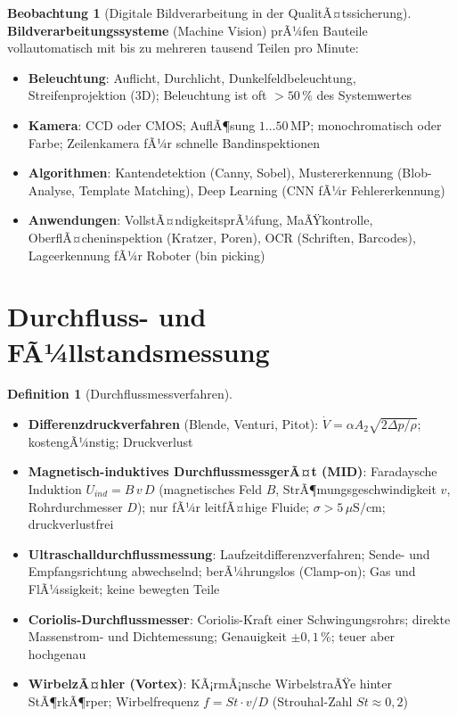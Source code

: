 ﻿\documentclass[a4paper,12pt]{report}
\theoremstyle{definition}
\newtheorem{definition}{Definition}
\newtheorem{beobachtung}{Beobachtung}
\begin{document}
\begin{beobachtung}[Digitale Bildverarbeitung in der QualitÃ¤tssicherung]
\textbf{Bildverarbeitungssysteme} (Machine Vision) prÃ¼fen Bauteile
vollautomatisch mit bis zu mehreren tausend Teilen pro Minute:
\begin{itemize}
    \item[-] \textbf{Beleuchtung}: Auflicht, Durchlicht, Dunkelfeldbeleuchtung,
          Streifenprojektion (3D); Beleuchtung ist oft $> 50\,\%$ des Systemwertes
    \item[-] \textbf{Kamera}: CCD oder CMOS; AuflÃ¶sung $1\ldots50\,\mathrm{MP}$;
          monochromatisch oder Farbe; Zeilenkamera fÃ¼r schnelle Bandinspektionen
    \item[-] \textbf{Algorithmen}: Kantendetektion (Canny, Sobel),
          Mustererkennung (Blob-Analyse, Template Matching),
          Deep Learning (CNN fÃ¼r Fehlererkennung)
    \item[-] \textbf{Anwendungen}: VollstÃ¤ndigkeitsprÃ¼fung, MaÃŸkontrolle,
          OberflÃ¤cheninspektion (Kratzer, Poren), OCR (Schriften, Barcodes),
          Lageerkennung fÃ¼r Roboter (bin picking)
\end{itemize}
\end{beobachtung}

\section{Durchfluss- und FÃ¼llstandsmessung}

\begin{definition}[Durchflussmessverfahren]
\begin{itemize}
    \item[-] \textbf{Differenzdruckverfahren} (Blende, Venturi, Pitot):
          $\dot{V} = \alpha A_2\sqrt{2\Delta p/\rho}$; kostengÃ¼nstig; Druckverlust
    \item[-] \textbf{Magnetisch-induktives DurchflussmessgerÃ¤t (MID)}:
          Faradaysche Induktion $U_{ind} = B\,v\,D$ (magnetisches Feld $B$,
          StrÃ¶mungsgeschwindigkeit $v$, Rohrdurchmesser $D$);
          nur fÃ¼r leitfÃ¤hige Fluide; $\sigma > 5\,\mu\mathrm{S/cm}$; druckverlustfrei
    \item[-] \textbf{Ultraschalldurchflussmessung}: Laufzeitdifferenzverfahren;
          Sende- und Empfangsrichtung abwechselnd; berÃ¼hrungslos (Clamp-on);
          Gas und FlÃ¼ssigkeit; keine bewegten Teile
    \item[-] \textbf{Coriolis-Durchflussmesser}: Coriolis-Kraft einer Schwingungsrohrs;
          direkte Massenstrom- und Dichtemessung; Genauigkeit $\pm 0{,}1\,\%$;
          teuer aber hochgenau
    \item[-] \textbf{WirbelzÃ¤hler (Vortex)}: KÃ¡rmÃ¡nsche WirbelstraÃŸe hinter StÃ¶rkÃ¶rper;
          Wirbelfrequenz $f = St\cdot v/D$ (Strouhal-Zahl $St \approx 0{,}2$)
\end{itemize}
\end{definition}
\end{document}
